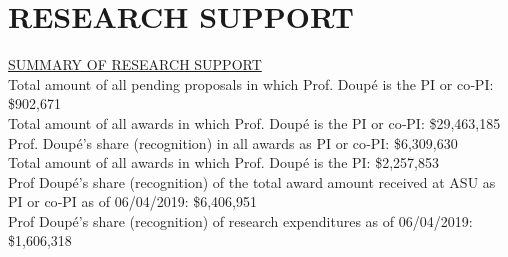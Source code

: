\documentclass[11pt,letterpaper,sans]{moderncv}
\begin{document}


\section{RESEARCH SUPPORT}

\begin{framed}
  \underline{SUMMARY OF RESEARCH SUPPORT} \\
  Total amount of all pending proposals in which Prof. Doup\'e is the PI or co‐PI: \$902,671 \\
  Total amount of all awards in which Prof. Doup\'e is the PI or co‐PI: \$29,463,185  \\
  Prof. Doup\'e's share (recognition) in all awards as PI or co‐PI: \$6,309,630  \\
  Total amount of all awards in which Prof. Doup\'e is the PI: \$2,257,853  \\
  Prof Doup\'e's share (recognition) of the total award amount received at ASU as PI or co‐PI as of 06/04/2019: \$6,406,951 \\
  Prof Doup\'e's share (recognition) of research expenditures as of 06/04/2019: \$1,606,318 \\
\end{framed}
\end{document}
